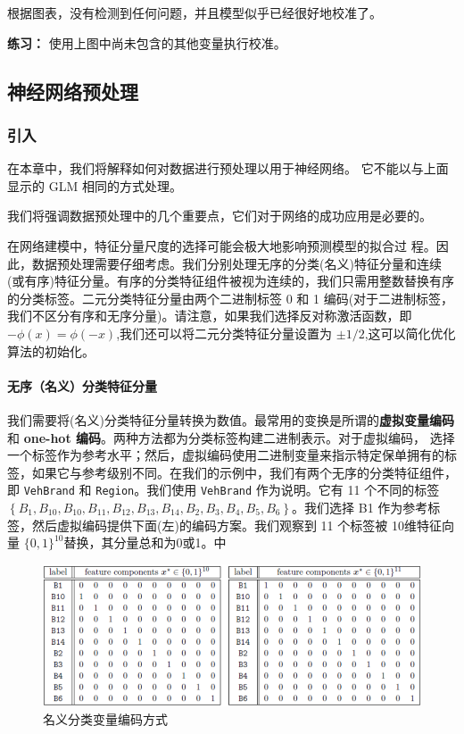 \documentclass[
]{article}
\begin{document}
根据图表，没有检测到任何问题，并且模型似乎已经很好地校准了。

\textbf{练习：} 使用上图中尚未包含的其他变量执行校准。

\subsection{神经网络预处理}\label{ux795eux7ecfux7f51ux7edcux9884ux5904ux7406}

\subsubsection{引入}\label{ux5f15ux5165}

在本章中，我们将解释如何对数据进行预处理以用于神经网络。
它不能以与上面显示的 GLM 相同的方式处理。

我们将强调数据预处理中的几个重要点，它们对于网络的成功应用是必要的。

在网络建模中，特征分量尺度的选择可能会极大地影响预测模型的拟合过
程。因此，数据预处理需要仔细考虑。我们分别处理无序的分类(名义)特征分量和连续(或有序)特征分量。有序的分类特征组件被视为连续的，我们只需用整数替换有序的分类标签。二元分类特征分量由两个二进制标签
0 和 1
编码(对于二进制标签，我们不区分有序和无序分量)。请注意，如果我们选择反对称激活函数，即\(-\phi(x)=\phi(-x)\),我们还可以将二元分类特征分量设置为
\(\pm1/2\),这可以简化优化算法的初始化。

\paragraph{无序（名义）分类特征分量}\label{ux65e0ux5e8fux540dux4e49ux5206ux7c7bux7279ux5f81ux5206ux91cf}

我们需要将(名义)分类特征分量转换为数值。最常用的变换是所谓的\textbf{虚拟变量编码}和
\textbf{one-hot
编码}。两种方法都为分类标签构建二进制表示。对于虚拟编码，
选择一个标签作为参考水平；然后，虚拟编码使用二进制变量来指示特定保单拥有的标签，如果它与参考级别不同。在我们的示例中，我们有两个无序的分类特征组件，即
\texttt{VehBrand} 和 \texttt{Region}。我们使用 \texttt{VehBrand}
作为说明。它有 11
个不同的标签\(\left\{B_1,B_{10},B_{10},B_{11},B_{12},B_{13},B_{14},B_{2},B_{3},B_{4},B_{5},B_{6}\right\}\)。我们选择
B1 作为参考标签，然后虚拟编码提供下面(左)的编码方案。我们观察到 11
个标签被 10维特征向量 \(\{0,1\}^{10}\)替换，其分量总和为0或1。中

\begin{figure}
\centering
\includegraphics{./Figs/Case2/Case2-Fig1.png}
\caption{名义分类变量编码方式}
\end{figure}
\end{document}
